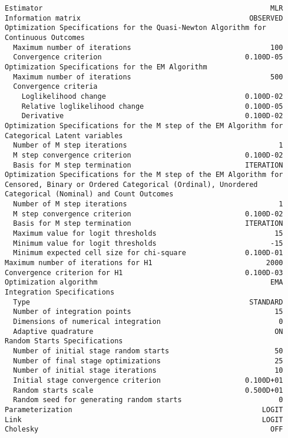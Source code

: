 \documentclass[]{article}
\begin{document}
\begin{verbatim}
Estimator                                                      MLR
Information matrix                                        OBSERVED
Optimization Specifications for the Quasi-Newton Algorithm for
Continuous Outcomes
  Maximum number of iterations                                 100
  Convergence criterion                                  0.100D-05
Optimization Specifications for the EM Algorithm
  Maximum number of iterations                                 500
  Convergence criteria
    Loglikelihood change                                 0.100D-02
    Relative loglikelihood change                        0.100D-05
    Derivative                                           0.100D-02
Optimization Specifications for the M step of the EM Algorithm for
Categorical Latent variables
  Number of M step iterations                                    1
  M step convergence criterion                           0.100D-02
  Basis for M step termination                           ITERATION
Optimization Specifications for the M step of the EM Algorithm for
Censored, Binary or Ordered Categorical (Ordinal), Unordered
Categorical (Nominal) and Count Outcomes
  Number of M step iterations                                    1
  M step convergence criterion                           0.100D-02
  Basis for M step termination                           ITERATION
  Maximum value for logit thresholds                            15
  Minimum value for logit thresholds                           -15
  Minimum expected cell size for chi-square              0.100D-01
Maximum number of iterations for H1                           2000
Convergence criterion for H1                             0.100D-03
Optimization algorithm                                         EMA
Integration Specifications
  Type                                                    STANDARD
  Number of integration points                                  15
  Dimensions of numerical integration                            0
  Adaptive quadrature                                           ON
Random Starts Specifications
  Number of initial stage random starts                         50
  Number of final stage optimizations                           25
  Number of initial stage iterations                            10
  Initial stage convergence criterion                    0.100D+01
  Random starts scale                                    0.500D+01
  Random seed for generating random starts                       0
Parameterization                                             LOGIT
Link                                                         LOGIT
Cholesky                                                       OFF


\end{verbatim}
\end{document}

